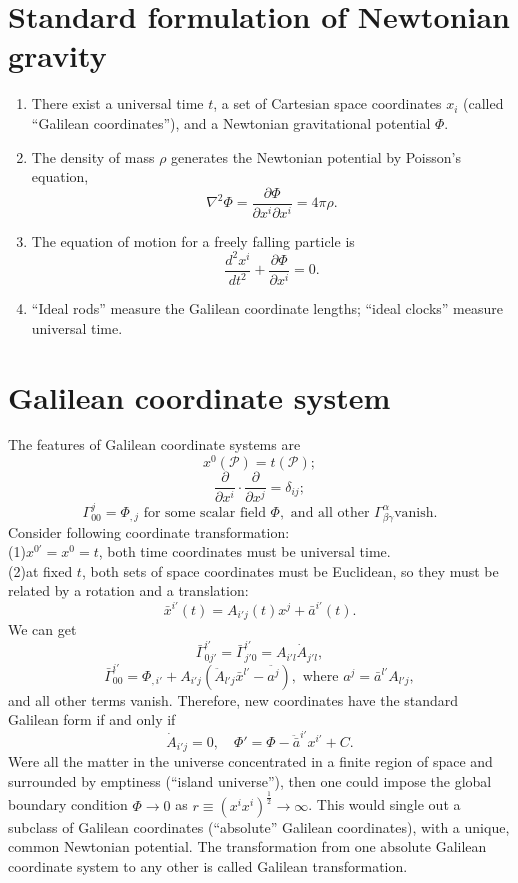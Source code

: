 \section{Standard formulation of Newtonian gravity}
\begin{enumerate}
\item There exist a universal time $t$, a set of Cartesian space coordinates $x_i$ (called ``Galilean coordinates''), and a Newtonian gravitational potential $\Phi$.
\item  The density of mass $\rho$ generates the Newtonian potential by Poisson's equation,
\[\nabla^2\Phi = \frac{\partial \Phi}{\partial x^i \partial x^i} = 4\pi\rho.\]
\item  The equation of motion for a freely falling particle is
\[\frac{d^2 x^i}{dt^2} + \frac{\partial \Phi}{\partial x^i} =0 .\]
\item  ``Ideal rods'' measure the Galilean coordinate lengths; ``ideal clocks'' measure universal time.
\end{enumerate}

\section{Galilean coordinate system}
\noindent
The features of Galilean coordinate systems are
\[x^0(\mathcal{P}) = t(\mathcal{P});\]
\[\frac{\partial}{\partial x^i} \cdot \frac{\partial}{\partial x^j} = \delta_{ij};\]
\[\Gamma^j_{00} = \Phi_{,j} \mbox{ for some scalar field }\Phi,\mbox{ and all other } \Gamma^{\alpha}_{\beta \gamma} \mbox{vanish}.\]
Consider following coordinate transformation:\\
(1)$x^{0'}=x^0=t$, both time coordinates must be universal time.\\
(2)at fixed $t$, both sets of space coordinates must be Euclidean, so they must be related by a rotation and a translation:
\[\bar{x}^{i'}(t) = A_{i'j}(t)x^j + \bar{a}^{i'}(t).\]
We can get
\[\bar{\Gamma}^{i'}_{0j'} = \bar{\Gamma}^{i'}_{j'0} = A_{i'l}\dot{A}_{j'l},\]
\[\bar{\Gamma}^{i'}_{00} = \Phi_{,i'} + A_{i'j}(\ddot{A}_{l'j}\bar{x}^{l'}-\ddot{a^{j}}), \mbox{   where }a^{j} = \bar{a}^{l'}A_{l'j},\]
and all other terms vanish.
Therefore, new coordinates have the standard Galilean form  if and only if
\[\dot{A}_{i'j}=0, \quad \Phi'= \Phi-\ddot{\bar{a}}^{i'}x^{i'}+C.\]
Were all the matter in the universe concentrated in a finite region of space and surrounded by emptiness (``island universe''), then one could impose the global boundary condition $\Phi \to 0$ as $r \equiv (x^ix^i)^{\frac{1}{2}} \to \infty$. This would single out a subclass of Galilean coordinates (``absolute'' Galilean coordinates), with a unique, common Newtonian potential. 
The transformation from one absolute Galilean coordinate system to any other is called Galilean transformation.

